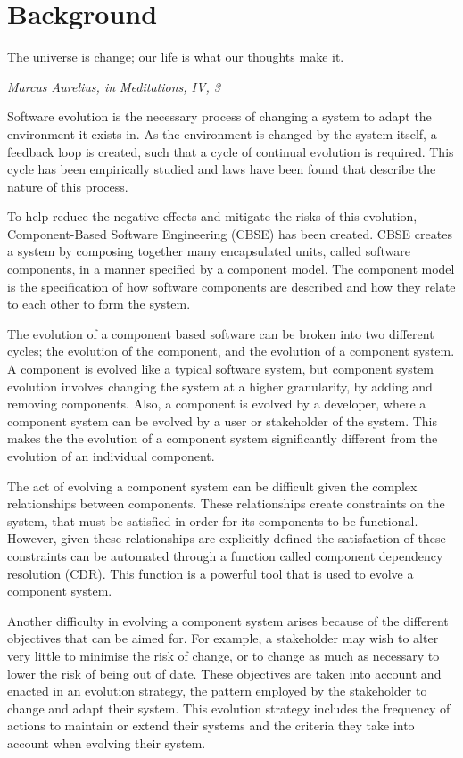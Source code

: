 \chapter{Background}
\label{background}
\epigraph{The universe is change; our life is what our thoughts make it.}
{\textit{Marcus Aurelius, in Meditations, IV, 3}}

Software evolution is the necessary process of changing a system to adapt the environment it exists in.
As the environment is changed by the system itself, a feedback loop \cite{lehman1980} is created, such that a cycle of continual evolution is required.
This cycle has been empirically studied and laws have been found that describe the nature of this process.  

To help reduce the negative effects and mitigate the risks of this evolution, Component-Based Software Engineering (CBSE) has been created. 
CBSE creates a system by composing together many encapsulated units, called software components, in a manner specified by a component model.
The component model is the specification of how software components are described and how they relate to each other to form the system.

The evolution of a component based software can be broken into two different cycles; the evolution of the component, and the evolution of a component system. 
A component is evolved like a typical software system, 
but component system evolution involves changing the system at a higher granularity, by adding and removing components.
Also, a component is evolved by a developer, where a component system can be evolved by a user or stakeholder of the system.
This makes the the evolution of a component system significantly different from the evolution of an individual component.

The act of evolving a component system can be difficult given the complex relationships between components.
These relationships create constraints on the system, that must be satisfied in order for its components to be functional.
However, given these relationships are explicitly defined the satisfaction of these constraints can be automated through a function called component dependency resolution (CDR).
This function is a powerful tool that is used to evolve a component system.

Another difficulty in evolving a component system arises because of the different objectives that can be aimed for.
For example, a stakeholder may wish to alter very little to minimise the risk of change, or to change as much as necessary to lower the risk of being out of date.  
These objectives are taken into account and enacted in an evolution strategy, the pattern employed by the stakeholder to change and adapt their system.
This evolution strategy includes the frequency of actions to maintain or extend their systems and the criteria they take into account when evolving their system.


